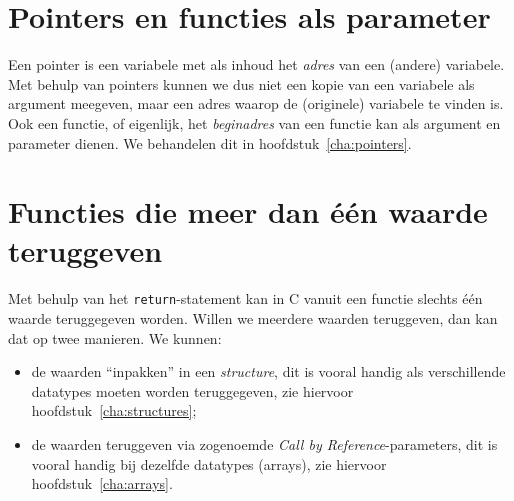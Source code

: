 \section{Pointers en functies als parameter}
Een pointer is een variabele met als inhoud het \textsl{adres} van een (andere) variabele. Met behulp van pointers kunnen we dus niet een kopie van een variabele als argument meegeven, maar een adres waarop de (originele) variabele te vinden is. Ook een functie, of eigenlijk, het \textsl{beginadres} van een functie kan als argument en parameter dienen. We behandelen dit in hoofdstuk~\ref{cha:pointers}.


\section{Functies die meer dan één waarde teruggeven}
Met behulp van het \texttt{return}-statement kan in C vanuit een functie slechts één waarde teruggegeven worden.
Willen we meerdere waarden teruggeven, dan kan dat op twee manieren. 
We kunnen:
\begin{itemize}
	\item
	de waarden ``inpakken'' in een \textsl{structure}, dit is vooral handig als verschillende datatypes moeten worden teruggegeven, zie hiervoor hoofdstuk~\ref{cha:structures};
	\item
	de waarden teruggeven via zogenoemde \emph{Call by Reference}-parameters, dit is vooral handig bij dezelfde datatypes (arrays), zie hiervoor hoofdstuk~\ref{cha:arrays}.
\end{itemize}



